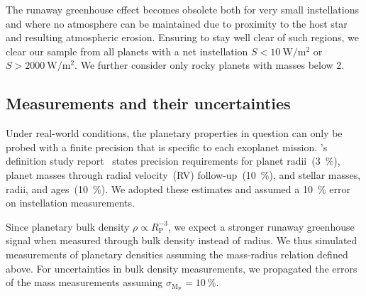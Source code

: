 \documentclass[twocolumn,twocolappendix]{aastex631}
\begin{document}
The runaway greenhouse effect becomes obsolete both for very small instellations and where no atmosphere can be maintained due to proximity to the host star and resulting atmospheric erosion.
Ensuring to stay well clear of such regions, we clear our sample from all planets with a net instellation $S < \SI{10}{\watt\per\square\meter}$ or $S > \SI{2000}{\watt\per\square\meter}$.
We further consider only rocky planets with masses below \SI{2}{\Mearth}. %

\subsection{Measurements and their uncertainties}
Under real-world conditions, the planetary properties in question can only be probed with a finite precision that is specific to each exoplanet mission.
\plato's definition study report~\citep{plato2017} states precision requirements for planet radii~(\SI{3}{\percent}), planet masses through radial velocity~(RV) follow-up~(\SI{10}{\percent}), and stellar masses, radii, and ages~(\SI{10}{\percent}).
We adopted these estimates and assumed a \SI{10}{\percent} error on instellation measurements.

Since planetary bulk density $\rho \propto R_\mathrm{P}^{-3}$, we expect a stronger runaway greenhouse signal when measured through bulk density instead of radius.
We thus simulated measurements of planetary densities assuming the mass-radius relation defined above.
For uncertainties in bulk density measurements, we propagated the errors of the mass measurements assuming $\sigma_\mathrm{M_\mathrm{P}} = \SI{10}{\percent}$.
\end{document}
